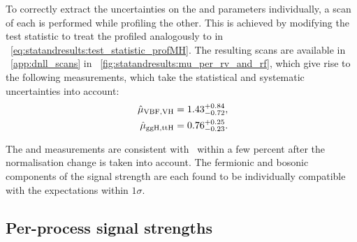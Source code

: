 To correctly extract the uncertainties on  the \muF and \muV parameters individually, a \DNLL scan of each is performed while profiling the other. This is achieved by modifying the test statistic to treat the profiled \POI analogously to \mH in \Eq~\ref{eq:statandresults:test_statistic_profMH}. 
The resulting scans are available in \App~\ref{app:dnll_scans} in \Fig~\ref{fig:statandresults:mu_per_rv_and_rf}, which give rise to the following measurements, which take the statistical and systematic uncertainties into account:
\begin{equation*}
\begin{split}
\,\hat{\mu}_{\text{VBF},\text{VH}} = 1.43^{+0.84}_{-0.72}, \\
\,\hat{\mu}_{\text{ggH},\text{ttH}} = 0.76^{+0.25}_{-0.23}.
\end{split}
\end{equation*}

The \muF and \muV measurements are consistent with~\cite{CMS-PAS-HIG-16-020} within a few percent after the normalisation change is taken into account. The fermionic and bosonic components of the signal strength are each found to be individually compatible with the \SM expectations within $1\sigma$. %


\subsection{Per-process signal strengths}
\label{sec:statandresults:mu_per_proc}


